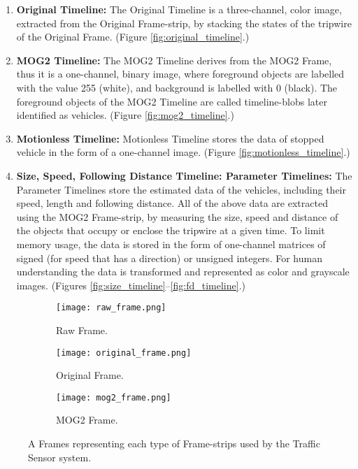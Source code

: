 \begin{enumerate}
	\item \textbf{Original Timeline:} The Original Timeline is a three-channel, color image, extracted from the Original Frame-strip, by stacking the states of the tripwire of the Original Frame. (Figure \ref{fig:original_timeline}.)
	
	\item \textbf{MOG2 Timeline:} The MOG2 Timeline derives from the MOG2 Frame, thus it is a one-channel, binary image, where foreground objects are labelled with the value 255 (white), and background is labelled with 0 (black). The foreground objects of the MOG2 Timeline are called timeline-blobs later identified as vehicles. (Figure \ref{fig:mog2_timeline}.)
	
	\item \textbf{Motionless Timeline:} Motionless Timeline stores the data of stopped vehicle in the form of a one-channel image. (Figure \ref{fig:motionless_timeline}.)
	
	\item \textbf{Size, Speed, Following Distance Timeline: Parameter Timelines:}
	The Parameter Timelines store the estimated data of the vehicles, including their speed, length and following distance. All of the above data are extracted using the MOG2 Frame-strip, by measuring the size, speed and distance of the objects that occupy or enclose the tripwire at a given time.
	To limit memory usage, the data is stored in the form of one-channel matrices of signed (for speed that has a direction) or unsigned integers. For human understanding the data is transformed and represented as color and grayscale images. (Figures \ref{fig:size_timeline}--\ref{fig:fd_timeline}.)
\end{enumerate}

\begin{figure}[!h]
	\centering
	\begin{subfigure}[!h]{0.5\textwidth}
		\texttt{[image: raw\_frame.png]}
		\caption{Raw Frame. \label{fig:raw_frame}}
	\end{subfigure}
	\quad
	\begin{subfigure}[!h]{0.35\textwidth}
		\texttt{[image: original\_frame.png]}
		\caption{Original Frame.\label{fig:original_frame}}
	\end{subfigure}
	\hfill
	\begin{subfigure}[!h]{0.35\textwidth}
		\texttt{[image: mog2\_frame.png]}
		\caption{MOG2 Frame. \label{fig:mog2_frame}}
	\end{subfigure}
	\caption{A Frames representing each type of Frame-strips used by the Traffic Sensor system.\label{fig:frame_types}}
\end{figure}

